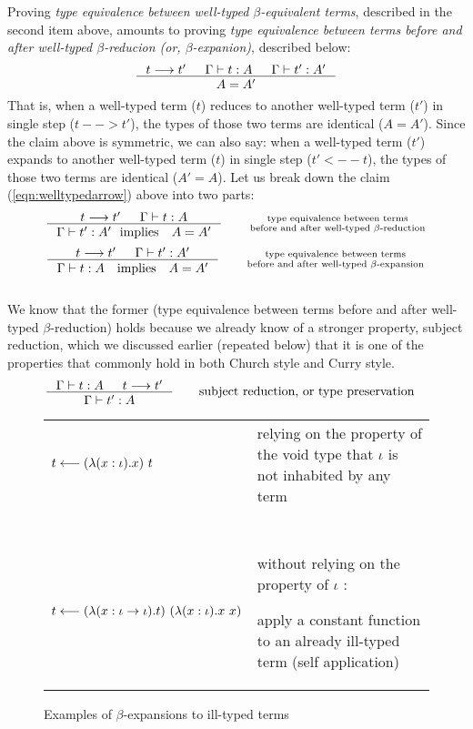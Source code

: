 Proving \emph{type equivalence between well-typed $\beta$-equivalent terms},
described in the second item above, amounts to proving \emph{type equivalence
between terms before and after well-typed $\beta$-reducion
(or, $\beta$-expanion)},
described below:
\begin{align}
\inference{t --> t' & \Gamma |- t : A & \Gamma |- t' : A'}{A = A'}
	\label{eqn:welltypedarrow}
\end{align}
That is, when a well-typed term ($t$) reduces to
another well-typed term ($t'$) in single step ($t --> t'$),
the types of those two terms are identical ($A=A'$).
Since the claim above is symmetric, we can also say: when a well-typed term
($t'$) expands to another well-typed term ($t$) in single step ($t' <-- t$),
the types of those two terms are identical ($A'=A$).
Let us break down the claim (\ref{eqn:welltypedarrow}) above into two parts:
\[
\inference{t --> t' & \Gamma |- t : A}
          {\Gamma |- t' : A' ~~\text{implies}\quad A = A'} \qquad
	\begin{smallmatrix}
		\text{type equivalence between terms} \\
  		\text{before and after well-typed $\beta$-reduction}
	\end{smallmatrix}
\]
\[
\inference{t --> t' & \Gamma |- t' : A'}
          {\Gamma |- t : A \quad\text{implies}\quad A = A'} \qquad
	\begin{smallmatrix}
		\text{type equivalence between terms} \\
  		\text{before and after well-typed $\beta$-expansion}
	\end{smallmatrix}
\]~\vspace*{-3em}\\

We know that the former (type equivalence between terms before and after
well-typed $\beta$-reduction) holds because we already know of
a stronger property, subject reduction, which we discussed earlier
(repeated below) that it is one of the properties that commonly hold
in both Church style and Curry style.
\begin{align*}
\inference{\Gamma |- t : A  & t --> t'}{\Gamma |- t' : A}
 &\qquad \text{subject reduction, or type preservation}
\end{align*}

\begin{figure}
\begin{singlespace}
\begin{tabular}{lp{7cm}}
$t <-- (\lambda(x:\iota).x)~t$ &
relying on the property of the void type
that $\iota$ is not inhabited by any term
\\ ~ \\
$t <-- (\lambda(x:\iota -> \iota).t)~(\lambda(x:\iota).x~x)$ &
without relying on the property of $\iota$ : \par
apply a constant function to an already ill-typed term (self application)
\end{tabular}
\end{singlespace}
\caption{Examples of $\beta$-expansions to ill-typed terms}
\label{ill-typed_expand}
\end{figure}

